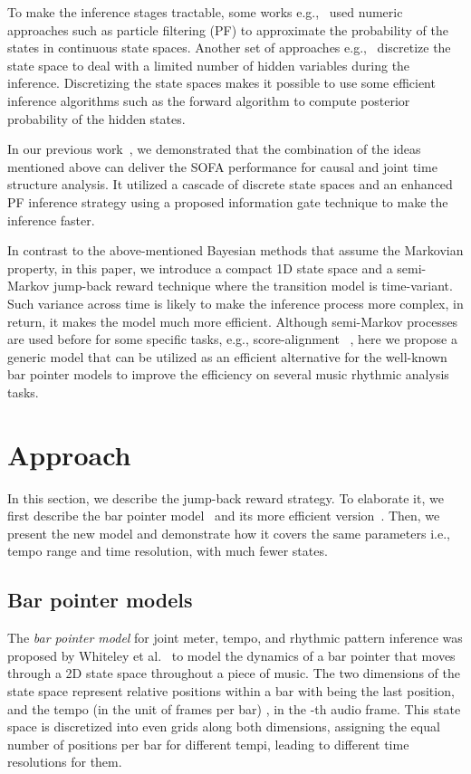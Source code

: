 \documentclass{article}
\begin{document}
To make the inference stages tractable, some works e.g.,~\cite{duan:1,Srinivasamurthy:1,Hainsworth:1,Cemgil:1,Holzapfel:2} used numeric approaches such as particle filtering (PF) to approximate the probability of the states in continuous state spaces. Another set of approaches e.g.,~\cite{whiteley:1,Krebs:1,Peeters:1,krebs:2,Holzapfel:1} discretize the state space to deal with a limited number of hidden variables during the inference. Discretizing the state spaces makes it possible to use some efficient inference algorithms
such as the forward algorithm to compute 
posterior probability of the hidden states. 

In our previous work~\cite{Heydari:2}, we demonstrated that the combination of the ideas mentioned above can deliver the SOFA performance for causal and joint time structure analysis. It utilized a cascade of discrete state spaces and an enhanced PF inference strategy using a proposed information gate technique to make the inference faster. 

In contrast to the above-mentioned Bayesian methods that assume the Markovian property, in this paper, we introduce a compact 1D state space and a semi-Markov jump-back reward technique where the transition model is time-variant. Such variance across time is likely to make the inference process more complex, in return, it makes the model much more efficient. Although semi-Markov processes are used before for some specific tasks, e.g., score-alignment ~\cite{cont}, here we propose a generic model that can be utilized as an efficient alternative for the well-known bar pointer models to improve the efficiency on several music rhythmic analysis tasks. 




\section{Approach}
\label{sec:approach}

In this section, we describe the jump-back reward strategy. To elaborate it, we first describe the bar pointer model~\cite{whiteley:1} and its more efficient version~\cite{Krebs:1}. Then, we present the new model and demonstrate how it covers the same parameters i.e., tempo range and time resolution, with much fewer states.

\subsection{Bar pointer models}
\label{ssec:bar pointer model}
The \textit{bar pointer model} for joint meter, tempo, and rhythmic pattern inference 
was proposed by Whiteley et al.~\cite{whiteley:1} to model the dynamics of a bar pointer that moves through a 2D state space throughout a piece of music. The two dimensions of the state space represent relative positions within a bar  with  being the last position, and the tempo (in the unit of frames per bar) , in the -th audio frame. This state space is discretized into even grids along both dimensions, assigning the equal number of positions per bar for different tempi, leading to different time resolutions for them.
\end{document}
